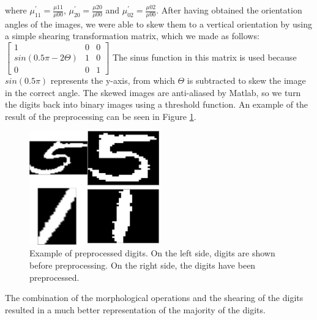 \documentclass[11pt,twoside,a4paper]{article}
\begin{document}
where $\mu_{11}^{'} = \frac{\mu{11}}{\mu{00}}$, $\mu_{20}^{'} = \frac{\mu{20}}{\mu{00}}$ and $\mu_{02}^{'} = \frac{\mu{02}}{\mu{00}}$.
\newline\newline
After having obtained the orientation angles of the images, we were able to skew them to a vertical orientation by using a simple shearing transformation matrix, which we made as follows:
\newline\newline
$\begin{bmatrix}
       1                       & 0           & 0           \\[0.3em]
       sin(0.5\pi - 2\Theta)   & 1           & 0		   \\[0.3em]
       0                       & 0           & 1
\end{bmatrix}$
\newline\newline\newline
The sinus function in this matrix is used because $sin(0.5\pi)$ represents the y-axis, from which $\Theta$ is subtracted to skew the image in the correct angle. The skewed images are anti-aliased by Matlab, so we turn the digits back into binary images using a threshold function. An example of the result of the preprocessing can be seen in Figure \ref{img:preprocced}.

\begin{figure}[h]
  \centering
  \captionsetup{justification=centering}
  \includegraphics[width=0.5\textwidth]{preprocced.png}
  \caption{Example of preprocessed digits. On the left side, digits are shown before preprocessing. On the right side, the digits have been preprocessed.}
  \label{img:preprocced}
\end{figure}


The combination of the morphological operations and the shearing of the digits resulted in a much better representation of the majority of the digits.\\
\end{document}
